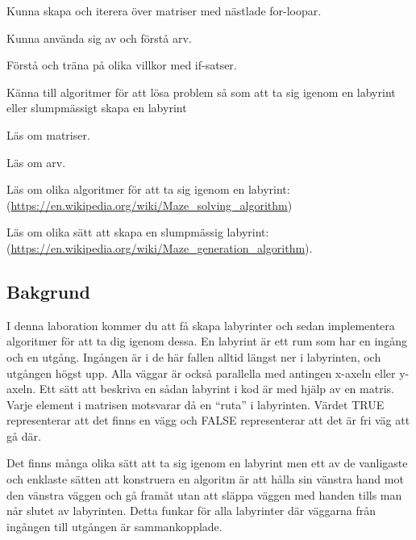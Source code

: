 

\Lab{\LabWeekNINE}

\begin{Goals}
\item Kunna skapa och iterera över matriser med nästlade for-loopar.
\item Kunna använda sig av och förstå arv.
\item Förstå och träna på olika villkor med if-satser.
\item Känna till algoritmer för att lösa problem så som att ta sig igenom en labyrint eller slumpmässigt skapa en labyrint
\end{Goals}

\begin{Preparations}
\item Läs om matriser.
\item Läs om arv.
\item Läs om olika algoritmer för att ta sig igenom en labyrint: \\
(\url{https://en.wikipedia.org/wiki/Maze\_solving\_algorithm})
\item Läs om olika sätt att skapa en slumpmässig labyrint: \\
(\url{https://en.wikipedia.org/wiki/Maze\_generation\_algorithm}).
\end{Preparations}

\subsection{Bakgrund}
I denna laboration kommer du att få skapa labyrinter och sedan implementera algoritmer för att ta dig igenom dessa. En labyrint är ett rum som har en ingång och en utgång. Ingången är i de här fallen alltid längst ner i labyrinten, och utgången högst upp. Alla väggar är också parallella med antingen x-axeln eller y-axeln. Ett sätt att beskriva en sådan labyrint i kod är med hjälp av en matris. Varje element i matrisen motsvarar då en ``ruta'' i labyrinten. Värdet TRUE representerar att det finns en vägg och FALSE representerar att det är fri väg att gå där.

Det finns många olika sätt att ta sig igenom en labyrint men ett av de vanligaste och enklaste sätten att konstruera en algoritm är att hålla sin vänstra hand mot den vänstra väggen och gå framåt utan att släppa väggen med handen tills man når slutet av labyrinten. Detta funkar för alla labyrinter där väggarna från ingången till utgången är sammankopplade.


